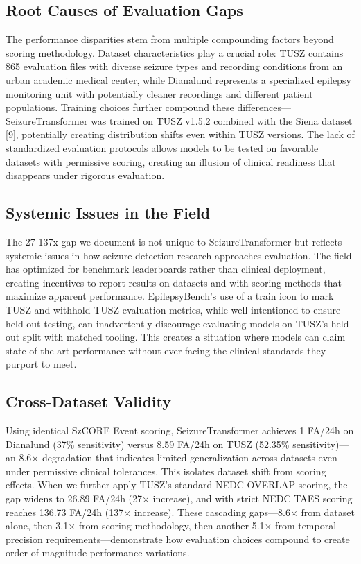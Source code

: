 \documentclass[
]{article}
\begin{document}
\hypertarget{root-causes-of-evaluation-gaps}{%
\subsection{Root Causes of Evaluation
Gaps}\label{root-causes-of-evaluation-gaps}}

The performance disparities stem from multiple compounding factors
beyond scoring methodology. Dataset characteristics play a crucial role:
TUSZ contains 865 evaluation files with diverse seizure types and
recording conditions from an urban academic medical center, while
Dianalund represents a specialized epilepsy monitoring unit with
potentially cleaner recordings and different patient populations.
Training choices further compound these differences---SeizureTransformer
was trained on TUSZ v1.5.2 combined with the Siena dataset {[}9{]},
potentially creating distribution shifts even within TUSZ versions. The
lack of standardized evaluation protocols allows models to be tested on
favorable datasets with permissive scoring, creating an illusion of
clinical readiness that disappears under rigorous evaluation.

\hypertarget{systemic-issues-in-the-field}{%
\subsection{Systemic Issues in the
Field}\label{systemic-issues-in-the-field}}

The 27-137x gap we document is not unique to SeizureTransformer but
reflects systemic issues in how seizure detection research approaches
evaluation. The field has optimized for benchmark leaderboards rather
than clinical deployment, creating incentives to report results on
datasets and with scoring methods that maximize apparent performance.
EpilepsyBench's use of a train icon to mark TUSZ and withhold TUSZ
evaluation metrics, while well-intentioned to ensure held-out testing,
can inadvertently discourage evaluating models on TUSZ's held-out split
with matched tooling. This creates a situation where models can claim
state-of-the-art performance without ever facing the clinical standards
they purport to meet.

\hypertarget{cross-dataset-validity}{%
\subsection{Cross-Dataset Validity}\label{cross-dataset-validity}}

Using identical SzCORE Event scoring, SeizureTransformer achieves 1
FA/24h on Dianalund (37\% sensitivity) versus 8.59 FA/24h on TUSZ
(52.35\% sensitivity)---an 8.6× degradation that indicates limited
generalization across datasets even under permissive clinical
tolerances. This isolates dataset shift from scoring effects. When we
further apply TUSZ's standard NEDC OVERLAP scoring, the gap widens to
26.89 FA/24h (27× increase), and with strict NEDC TAES scoring reaches
136.73 FA/24h (137× increase). These cascading gaps---8.6× from dataset
alone, then 3.1× from scoring methodology, then another 5.1× from
temporal precision requirements---demonstrate how evaluation choices
compound to create order-of-magnitude performance variations.
\end{document}
